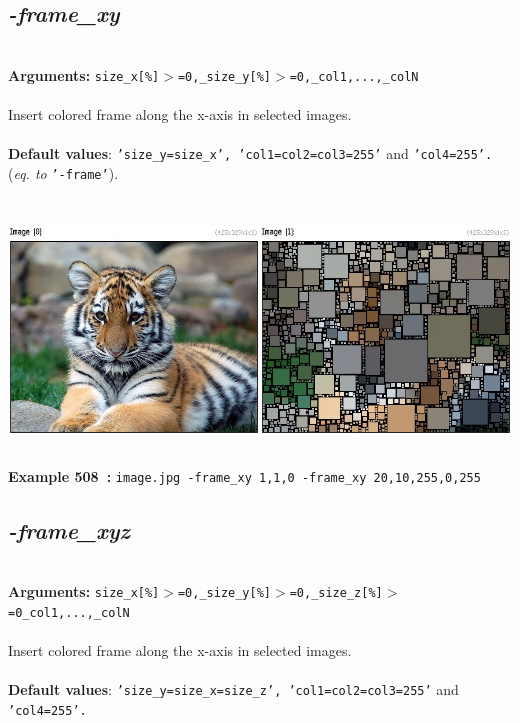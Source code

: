 \documentclass[a4paper,11pt,twoside]{book}
\begin{document}
\subsection{\emph{-frame\_xy} }\vspace*{-0.5em}
~\\\textbf{Arguments: } 
{\small \texttt{size\_x[\%]$>$=0,\_size\_y[\%]$>$=0,\_col1,...,\_colN}}\\~\\
Insert colored frame along the x-axis in selected images.
~\\~\\\textbf{Default values}: {\small \texttt{'size\_y=size\_x', 'col1=col2=col3=255'} and \texttt{'col4=255'.}}
~\\(\emph{eq. to} {\small \texttt{'-frame'}}).
\begin{center}\includegraphics[keepaspectratio=true,height=7cm,width=\textwidth]{img/gmic_def508.jpg}\\
{\footnotesize \textbf{Example 508~:} \texttt{image.jpg -frame\_xy 1,1,0 -frame\_xy 20,10,255,0,255}}
\end{center}

\subsection{\emph{-frame\_xyz} }\vspace*{-0.5em}
~\\\textbf{Arguments: } 
{\small \texttt{size\_x[\%]$>$=0,\_size\_y[\%]$>$=0,\_size\_z[\%]$>$=0\_col1,...,\_colN}}\\~\\
Insert colored frame along the x-axis in selected images.
~\\~\\\textbf{Default values}: {\small \texttt{'size\_y=size\_x=size\_z', 'col1=col2=col3=255'} and \texttt{'col4=255'.}}
\end{document}
